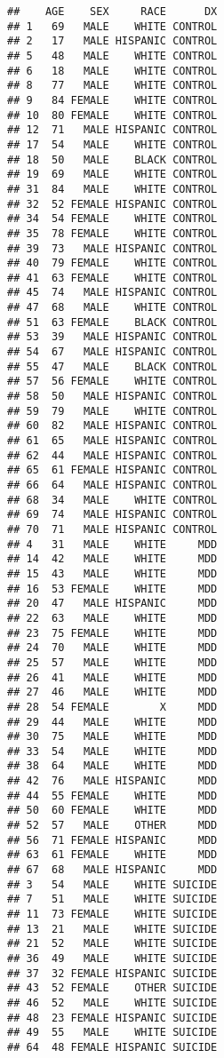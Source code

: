 \documentclass[]{article}
\begin{document}
\begin{verbatim}
##    AGE    SEX     RACE      DX
## 1   69   MALE    WHITE CONTROL
## 2   17   MALE HISPANIC CONTROL
## 5   48   MALE    WHITE CONTROL
## 6   18   MALE    WHITE CONTROL
## 8   77   MALE    WHITE CONTROL
## 9   84 FEMALE    WHITE CONTROL
## 10  80 FEMALE    WHITE CONTROL
## 12  71   MALE HISPANIC CONTROL
## 17  54   MALE    WHITE CONTROL
## 18  50   MALE    BLACK CONTROL
## 19  69   MALE    WHITE CONTROL
## 31  84   MALE    WHITE CONTROL
## 32  52 FEMALE HISPANIC CONTROL
## 34  54 FEMALE    WHITE CONTROL
## 35  78 FEMALE    WHITE CONTROL
## 39  73   MALE HISPANIC CONTROL
## 40  79 FEMALE    WHITE CONTROL
## 41  63 FEMALE    WHITE CONTROL
## 45  74   MALE HISPANIC CONTROL
## 47  68   MALE    WHITE CONTROL
## 51  63 FEMALE    BLACK CONTROL
## 53  39   MALE HISPANIC CONTROL
## 54  67   MALE HISPANIC CONTROL
## 55  47   MALE    BLACK CONTROL
## 57  56 FEMALE    WHITE CONTROL
## 58  50   MALE HISPANIC CONTROL
## 59  79   MALE    WHITE CONTROL
## 60  82   MALE HISPANIC CONTROL
## 61  65   MALE HISPANIC CONTROL
## 62  44   MALE HISPANIC CONTROL
## 65  61 FEMALE HISPANIC CONTROL
## 66  64   MALE HISPANIC CONTROL
## 68  34   MALE    WHITE CONTROL
## 69  74   MALE HISPANIC CONTROL
## 70  71   MALE HISPANIC CONTROL
## 4   31   MALE    WHITE     MDD
## 14  42   MALE    WHITE     MDD
## 15  43   MALE    WHITE     MDD
## 16  53 FEMALE    WHITE     MDD
## 20  47   MALE HISPANIC     MDD
## 22  63   MALE    WHITE     MDD
## 23  75 FEMALE    WHITE     MDD
## 24  70   MALE    WHITE     MDD
## 25  57   MALE    WHITE     MDD
## 26  41   MALE    WHITE     MDD
## 27  46   MALE    WHITE     MDD
## 28  54 FEMALE        X     MDD
## 29  44   MALE    WHITE     MDD
## 30  75   MALE    WHITE     MDD
## 33  54   MALE    WHITE     MDD
## 38  64   MALE    WHITE     MDD
## 42  76   MALE HISPANIC     MDD
## 44  55 FEMALE    WHITE     MDD
## 50  60 FEMALE    WHITE     MDD
## 52  57   MALE    OTHER     MDD
## 56  71 FEMALE HISPANIC     MDD
## 63  61 FEMALE    WHITE     MDD
## 67  68   MALE HISPANIC     MDD
## 3   54   MALE    WHITE SUICIDE
## 7   51   MALE    WHITE SUICIDE
## 11  73 FEMALE    WHITE SUICIDE
## 13  21   MALE    WHITE SUICIDE
## 21  52   MALE    WHITE SUICIDE
## 36  49   MALE    WHITE SUICIDE
## 37  32 FEMALE HISPANIC SUICIDE
## 43  52 FEMALE    OTHER SUICIDE
## 46  52   MALE    WHITE SUICIDE
## 48  23 FEMALE HISPANIC SUICIDE
## 49  55   MALE    WHITE SUICIDE
## 64  48 FEMALE HISPANIC SUICIDE
\end{verbatim}
\end{document}
